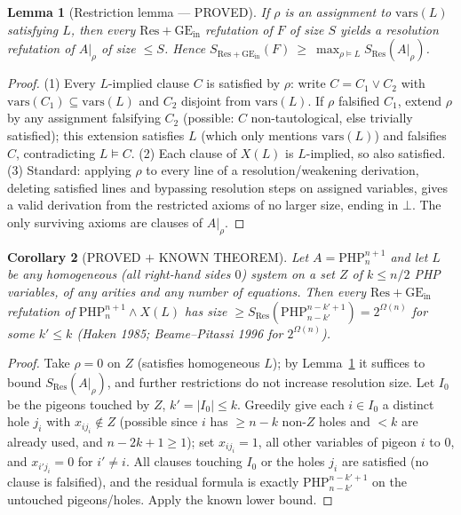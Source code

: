 \documentclass[11pt]{article}
\newtheorem{lemma}{Lemma}
\newtheorem{corollary}[lemma]{Corollary}
\begin{document}
\begin{lemma}[Restriction lemma --- PROVED]\label{lem:restr}
If $\rho$ is an assignment to $\mathrm{vars}(L)$ satisfying $L$, then every $\mathrm{Res}{+}\mathrm{GE}_{\mathrm{in}}$ refutation of $F$ of size $S$ yields a resolution refutation of $A|_\rho$ of size $\le S$. Hence $S_{\mathrm{Res+GE_{in}}}(F)\ \ge\ \max_{\rho\models L} S_{\mathrm{Res}}(A|_\rho)$.
\end{lemma}
\begin{proof}
(1) Every $L$-implied clause $C$ is satisfied by $\rho$: write $C=C_1\vee C_2$ with $\mathrm{vars}(C_1)\subseteq\mathrm{vars}(L)$ and $C_2$ disjoint from $\mathrm{vars}(L)$. If $\rho$ falsified $C_1$, extend $\rho$ by any assignment falsifying $C_2$ (possible: $C$ non-tautological, else trivially satisfied); this extension satisfies $L$ (which only mentions $\mathrm{vars}(L)$) and falsifies $C$, contradicting $L\models C$. (2) Each clause of $X(L)$ is $L$-implied, so also satisfied. (3) Standard: applying $\rho$ to every line of a resolution/weakening derivation, deleting satisfied lines and bypassing resolution steps on assigned variables, gives a valid derivation from the restricted axioms of no larger size, ending in $\bot$. The only surviving axioms are clauses of $A|_\rho$.
\end{proof}

\begin{corollary}[PROVED $+$ KNOWN THEOREM]\label{cor:php}
Let $A=\mathrm{PHP}^{n+1}_n$ and let $L$ be any \emph{homogeneous} (all right-hand sides $0$) system on a set $Z$ of $k\le n/2$ PHP variables, of any arities and any number of equations. Then every $\mathrm{Res}{+}\mathrm{GE}_{\mathrm{in}}$ refutation of $\mathrm{PHP}^{n+1}_n\wedge X(L)$ has size $\ge S_{\mathrm{Res}}(\mathrm{PHP}^{n-k'+1}_{n-k'})=2^{\Omega(n)}$ for some $k'\le k$ (Haken 1985; Beame--Pitassi 1996 for $2^{\Omega(n)}$).
\end{corollary}
\begin{proof}
Take $\rho=0$ on $Z$ (satisfies homogeneous $L$); by Lemma~\ref{lem:restr} it suffices to bound $S_{\mathrm{Res}}(A|_\rho)$, and further restrictions do not increase resolution size. Let $I_0$ be the pigeons touched by $Z$, $k'=|I_0|\le k$. Greedily give each $i\in I_0$ a distinct hole $j_i$ with $x_{i j_i}\notin Z$ (possible since $i$ has $\ge n-k$ non-$Z$ holes and $<k$ are already used, and $n-2k+1\ge1$); set $x_{ij_i}=1$, all other variables of pigeon $i$ to $0$, and $x_{i'j_i}=0$ for $i'\ne i$. All clauses touching $I_0$ or the holes $j_i$ are satisfied (no clause is falsified), and the residual formula is exactly $\mathrm{PHP}^{n-k'+1}_{n-k'}$ on the untouched pigeons/holes. Apply the known lower bound.
\end{proof}
\end{document}
